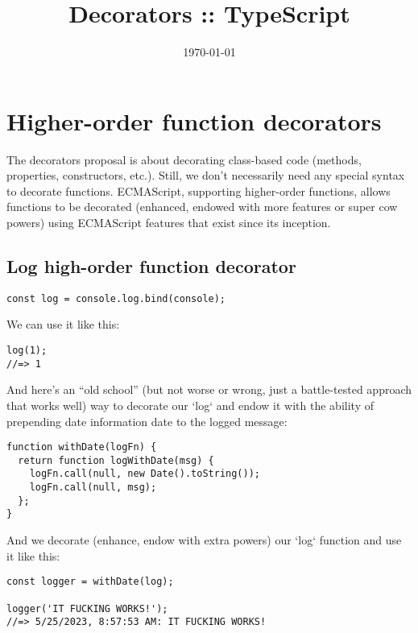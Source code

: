 \documentclass[11pt]{article}
\date{\today}
\title{Decorators :: TypeScript}
\begin{document}
\maketitle
\tableofcontents


\section{Higher-order function decorators}
\label{sec:org33dad4b}

The decorators proposal is about decorating class-based code (methods,
properties, constructors, etc.).  Still, we don't necessarily need any
special syntax to decorate functions.  ECMAScript, supporting
higher-order functions, allows functions to be decorated (enhanced,
endowed with more features or super cow powers) using ECMAScript
features that exist since its inception.

\subsection{Log high-order function decorator}
\label{sec:orgcf00fd0}

\begin{verbatim}
const log = console.log.bind(console);
\end{verbatim}

We can use it like this:

\begin{verbatim}
log(1);
//=> 1
\end{verbatim}

And here's an “old school” (but not worse or wrong, just a
battle-tested approach that works well) way to decorate our `log` and
endow it with the ability of prepending date information date to the
logged message:

\begin{verbatim}
function withDate(logFn) {
  return function logWithDate(msg) {
    logFn.call(null, new Date().toString());
    logFn.call(null, msg);
  };
}
\end{verbatim}

And we decorate (enhance, endow with extra powers) our `log` function
and use it like this:

\begin{verbatim}
const logger = withDate(log);

logger('IT FUCKING WORKS!');
//=> 5/25/2023, 8:57:53 AM: IT FUCKING WORKS!
\end{verbatim}
\end{document}
